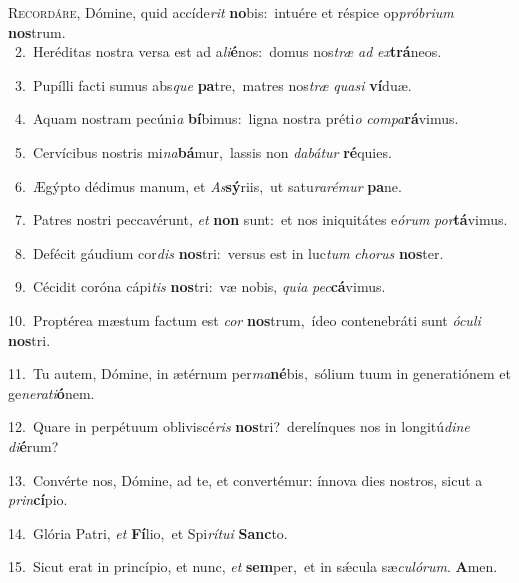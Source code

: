 \lettrine{\initial\textcolor{\initialcolor}{R}}{ecordáre,} Dómine, quid accíde\textit{rit} \textbf{no}\-bis:~\star intuére et réspice op\-\textit{pró}\-\textit{bri}\textit{um} \textbf{nos}\-trum.\\
{\numbfont\textcolor{\numbcolor}{~2.}}~Heréditas nostra versa est ad a\-\textit{li}\-\textbf{é}nos:~\star domus nos\textit{træ} \textit{ad} \textit{ex}\-\textbf{trá}neos.\par
{\numbfont\textcolor{\numbcolor}{~3.}}~Pupílli facti sumus abs\textit{que} \textbf{pa}\-tre,~\star matres nos\textit{træ} \textit{qua}\-\textit{si} \textbf{ví}\-duæ.\par
{\numbfont\textcolor{\numbcolor}{~4.}}~Aquam nostram pecúni\textit{a} \textbf{bí}\-bimus:~\star ligna nostra préti\textit{o} \textit{com}\-\textit{pa}\textbf{rá}vimus.\par
{\numbfont\textcolor{\numbcolor}{~5.}}~Cervícibus nostris mi\-\textit{na}\-\textbf{bá}mur,~\star lassis non \textit{da}\-\textit{bá}\textit{tur} \textbf{ré}\-quies.\par
{\numbfont\textcolor{\numbcolor}{~6.}}~Ægýpto dédimus manum, et \textit{As}\-\textbf{sý}riis,~\star ut satu\-\textit{ra}\-\textit{ré}\textit{mur} \textbf{pa}\-ne.\par
{\numbfont\textcolor{\numbcolor}{~7.}}~Patres nostri peccavérunt, \textit{et} \textbf{non} sunt:~\star et nos iniquitátes e\-\textit{ó}\-\textit{rum} \textit{por}\-\textbf{tá}vimus.\par
{\numbfont\textcolor{\numbcolor}{~8.}}~Defécit gáudium cor\textit{dis} \textbf{nos}\-tri:~\star versus est in luc\textit{tum} \textit{cho}\-\textit{rus} \textbf{nos}\-ter.\par
{\numbfont\textcolor{\numbcolor}{~9.}}~Cécidit coróna cápi\textit{tis} \textbf{nos}\-tri:~\star væ nobis, \textit{qui}\-\textit{a} \textit{pec}\-\textbf{cá}vimus.\par
{\numbfont\textcolor{\numbcolor}{10.}}~Proptérea mæstum factum est \textit{cor} \textbf{nos}\-trum,~\star ídeo contenebráti sunt \textit{ó}\-\textit{cu}\textit{li} \textbf{nos}\-tri.\par
{\numbfont\textcolor{\numbcolor}{11.}}~Tu autem, Dómine, in ætérnum per\-\textit{ma}\-\textbf{né}bis,~\star sólium tuum in generatiónem et ge\-\textit{ne}\-\textit{ra}\textit{ti}\textbf{ó}nem.\par
{\numbfont\textcolor{\numbcolor}{12.}}~Quare in perpétuum obliviscé\textit{ris} \textbf{nos}\-tri?~\star derelínques nos in longitú\-\textit{di}\-\textit{ne} \textit{di}\-\textbf{é}rum?\par
{\numbfont\textcolor{\numbcolor}{13.}}~Convérte nos, Dómine, ad te, et convertémur: ínnova dies nostros, sicut a \textit{prin}\-\textbf{cí}pio.\par
{\numbfont\textcolor{\numbcolor}{14.}}~Glória Patri, \textit{et} \textbf{Fí}\-lio,~\star et Spi\-\textit{rí}\-\textit{tu}\textit{i} \textbf{Sanc}\-to.\par
{\numbfont\textcolor{\numbcolor}{15.}}~Sicut erat in princípio, et nunc, \textit{et} \textbf{sem}\-per,~\star et in sǽcula sæ\-\textit{cu}\-\textit{ló}\textit{rum}. \textbf{A}\-men.\par
